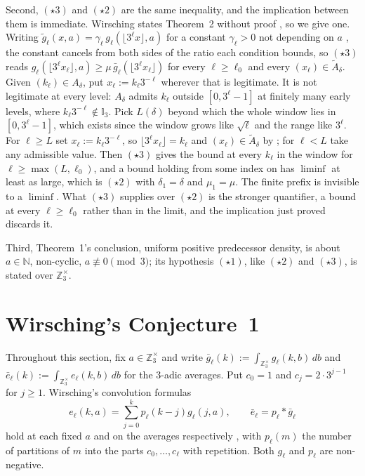 \documentclass[11pt]{article}
\theoremstyle{definition}
\theoremstyle{remark}
\begin{document}
Second, $(\star3)$ and $(\star2)$ are the same inequality, and the
implication between them is immediate. Wirsching states Theorem~2
without proof \cite[\S3]{Wirsching2003}, so we give one. Writing
$\widetilde g_\ell(x,a)=\gamma_\ell\,g_\ell(\lfloor3^\ell
x\rfloor,a)$ for a constant $\gamma_\ell>0$ not depending on $a$
\cite[\S3]{Wirsching2003}, the constant cancels from both sides of the
ratio each condition bounds, so $(\star3)$ reads
$g_\ell(\lfloor3^\ell x_\ell\rfloor,a)\ge\mu\,\bar g_\ell(\lfloor3^\ell
x_\ell\rfloor)$ for every $\ell\ge\ell_0$ and every
$(x_\ell)\in\widetilde A_\delta$. Given $(k_\ell)\in A_\delta$, put $x_\ell:=k_\ell3^{-\ell}$ wherever
that is legitimate. It is not legitimate at every level: $A_\delta$
admits $k_\ell$ outside $[0,3^\ell-1]$ at finitely many early levels,
where $k_\ell3^{-\ell}\notin\mathbb I_3$. Pick $L(\delta)$ beyond which
the whole window lies in $[0,3^\ell-1]$, which exists since the window
grows like $\sqrt\ell$ and the range like $3^\ell$. For $\ell\ge L$ set
$x_\ell:=k_\ell3^{-\ell}$, so $\lfloor3^\ell x_\ell\rfloor=k_\ell$ and
$(x_\ell)\in\widetilde A_\delta$ by \cite[eq.~(3.2)]{Wirsching2003}; for
$\ell<L$ take any admissible value. Then $(\star3)$ gives the bound at
every $k_\ell$ in the window for $\ell\ge\max(L,\ell_0)$, and a bound
holding from some index on has $\liminf$ at least as large, which is
$(\star2)$ with $\delta_1=\delta$ and $\mu_1=\mu$. The finite prefix is
invisible to a $\liminf$. What $(\star3)$ supplies over $(\star2)$ is
the stronger quantifier, a bound at every $\ell\ge\ell_0$ rather than
in the limit, and the implication just proved discards it.

Third, Theorem~1's conclusion, uniform positive predecessor density, is
about $a\in\mathbb N$, non-cyclic, $a\not\equiv0\pmod3$; its hypothesis
$(\star1)$, like $(\star2)$ and $(\star3)$, is stated over
$\mathbb Z_3^\times$.

\section{Wirsching's Conjecture~1}
\label{sec:conj1}

Throughout this section, fix $a\in\mathbb Z_3^\times$ and write
$\bar g_\ell(k):=\int_{\mathbb Z_3^\times}g_\ell(k,b)\,db$ and
$\bar e_\ell(k):=\int_{\mathbb Z_3^\times}e_\ell(k,b)\,db$ for the
$3$-adic averages. Put $c_0=1$ and $c_j=2\cdot3^{j-1}$ for $j\ge1$.
Wirsching's convolution formulas
\begin{equation}\label{eq:elka-convolution}
 e_\ell(k,a)=\sum_{j=0}^k p_\ell(k-j)g_\ell(j,a),
 \qquad \bar e_\ell=p_\ell*\bar g_\ell
\end{equation}
hold at each fixed $a$ and on the averages respectively
\cite[eq.~(2.3),~(2.4)]{Wirsching2003}, with $p_\ell(m)$ the number of
partitions of $m$ into the parts $c_0,\ldots,c_\ell$ with repetition.
Both $g_\ell$ and $p_\ell$ are non-negative.
\end{document}
